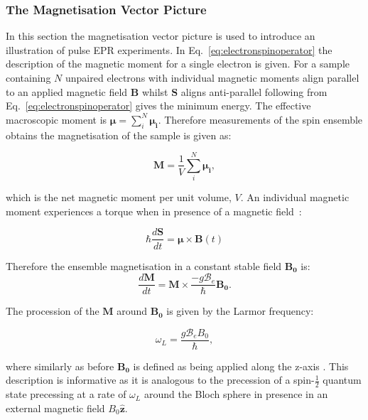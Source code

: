 \subsubsection{The Magnetisation Vector Picture}
In this section the magnetisation vector picture is used to introduce an illustration of pulse EPR experiments. In Eq.~\ref{eq:electronspinoperator} the description of the magnetic moment for a single electron is given. For a sample containing $N$ unpaired electrons with individual magnetic moments align parallel to an applied magnetic field $\textbf{B}$ whilst $\textbf{S}$ aligns anti-parallel following from Eq.~\ref{eq:electronspinoperator} gives the minimum energy. The effective macroscopic moment is $\bm{\mu}=\sum_{i}^{N} \bm{\mu_{i}}$. Therefore measurements of the spin ensemble obtains the magnetisation of the sample is given as:


\begin{equation}
\label{eq:macroscopicmagnetisation}
\textbf{M}=\frac{1}{V}\sum_{i}^{N} \bm{\mu_{i}},
\end{equation} 

\noindent which is the net magnetic moment per unit volume, $V$. An individual magnetic moment experiences a torque when in presence of a magnetic field~\citep{schweiger2001principles}:

\begin{equation}
\label{eq:torque}
\hbar \frac{d \textbf{S}}{d t}=\bm{\mu} \times \textbf{B}(t)
\end{equation} 

\noindent Therefore the ensemble magnetisation in a constant stable field $\bm{B_{0}}$ is:
\begin{equation}
\label{eq:magnetisationderiv}
\frac{d\bm{M}}{dt} = \bm{M} \times \frac{-g \mathcal{B}_{e}}{\hbar}\bm{B_{0}}.
\end{equation} 

\noindent The procession of the $\bm{M}$ around $\bm{B_{0}}$ is given by the Larmor frequency: 

\begin{equation}
\label{eq:Larmorfrequency}
\omega_{L} = \frac{g \mathcal{B}_{e} B_{0}}{\hbar},
\end{equation} 

where similarly as before $\bm{B_{0}}$ is defined as being applied along the z-axis \citep{foot2005atomic}. This description is informative as it is analogous to the precession of a spin-$\frac{1}{2}$ quantum state precessing at a rate of $\omega_{L}$ around the Bloch sphere in presence in an external magnetic field $B_{0}\bm{\hat{z}}$. 
 
